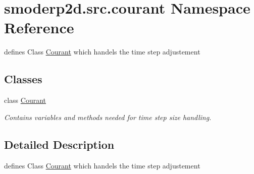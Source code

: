 \hypertarget{namespacesmoderp2d_1_1src_1_1courant}{\section{smoderp2d.\-src.\-courant Namespace Reference}
\label{namespacesmoderp2d_1_1src_1_1courant}
}


defines Class \hyperlink{classsmoderp2d_1_1src_1_1courant_1_1Courant}{Courant} which handels the time step adjustement  


\subsection*{Classes}
\begin{DoxyCompactItemize}
\item 
class \hyperlink{classsmoderp2d_1_1src_1_1courant_1_1Courant}{Courant}
\begin{DoxyCompactList}\small\item\em Contains variables and methods needed for time step size handling. \end{DoxyCompactList}\end{DoxyCompactItemize}


\subsection{Detailed Description}
defines Class \hyperlink{classsmoderp2d_1_1src_1_1courant_1_1Courant}{Courant} which handels the time step adjustement 